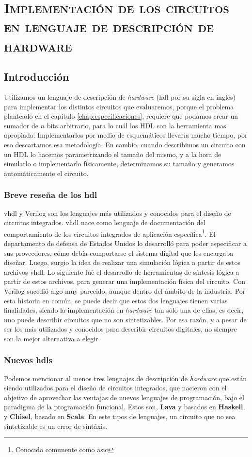\chapter{\textsc{Implementación de los circuitos en lenguaje de descripción de hardware} }\label{implementaciónHDL}
\section{Introducción}
Utilizamos un lenguaje de descripción de \emph{hardware} (\gls{hdl} por su sigla en inglés) para implementar los distintos circuitos que evaluaremos, porque el problema planteado en el capítulo \ref{chap:especificaciones}, requiere que podamos crear un sumador de $n$ bits arbitrario, para lo cuál los HDL son la herramienta mas apropiada. Implementarlos por medio de esquemáticos llevaría mucho tiempo, por eso descartamos esa metodología. En cambio, cuando describimos un circuito con un HDL lo hacemos parametrizando el tamaño del mismo, y a la hora de simularlo o implementarlo físicamente, determinamos su tamaño y generamos automáticamente el circuito. 

\subsection{Breve reseña de los \gls{hdl}}
\gls{vhdl} y Verilog son los lenguajes más utilizados y conocidos para el diseño de circuitos integrados. \gls{vhdl} nace como lenguaje de documentación del comportamiento de los circuitos integrados de aplicación específica\footnote{Conocido comunente como \gls{asic}}. El departamento de defensa de Estados Unidos lo desarrolló para poder especificar a sus proveedores, cómo debía comportarse el sistema digital que les encargaba diseñar. Luego, surgio la idea de realizar una simulación lógica a partir de estos archivos \gls{vhdl}. Lo siguiente fué el desarrollo de herramientas de síntesis lógica a partir de estos archivos, para generar una implementación física del circuito. Con Verilog sucedió algo muy parecido, aunque dentro del ámbito de la industria. Por esta historia en común, se puede decir que estos dos lenguajes tienen varias finalidades, siendo la implementación en \emph{hardware} tan sólo una de ellas, es decir, uno puede describir circuitos que no son sintetizables. Por esa razón, y a pesar de ser los más utilizados y conocidos para describir circuitos digitales, no siempre son la mejor alternativa a elegir.

\subsection{Nuevos \gls{hdl}s}\label{subsec:nuevosHDL}
Podemos mencionar al menos tres lenguajes de descripción de \emph{hardware} que están siendo utilizados para el diseño de circuitos integrados, que nacieron con el objetivo de aprovechar las ventajas de nuevos lenguajes de programación, bajo el paradigma de la programación funcional. Estos son, \textbf{Lava}\cite{Lava} y \cite{Clash} basados en \textbf{Haskell}, y \textbf{Chisel}\cite{Chisel}, basado en \textbf{Scala}. En este tipos de lenguajes, un circuito que no sea sintetizable es un error de sintáxis. 

